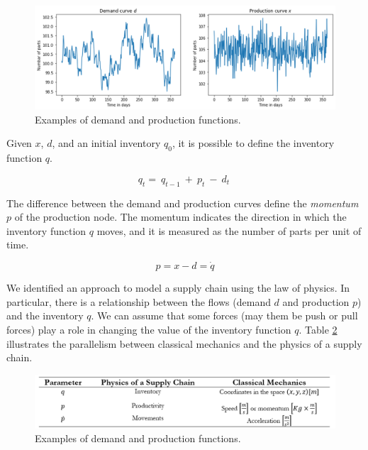 \begin{figure}[hbt!]
\centering
\includegraphics[width=1\textwidth]{SectionIntroduction/informationFramework_figures/fig_demandProduction.png}
\captionsetup{type=figure}
\caption{Examples of demand and production functions.}
\label{fig_demandProduction}
\end{figure}

Given $x$, $d$, and an initial inventory $q_0$, it is possible to define the inventory function $q$.

\begin{equation}
q_t=\ q_{t-1}\ +\ p_t\ -\ d_t\ 
\label{eq_physics1}
\end{equation}

The difference between the demand and production curves define the \textit{momentum} $p$ of the production node. The momentum indicates the direction in which the inventory function $q$ moves, and it is measured as the number of parts per unit of time.

\begin{equation}
p=x-d=\dot{q}
\label{eq_physics2}
\end{equation}

We identified an approach to model a supply chain using the law of physics. In particular, there is a relationship between the flows (demand $d$ and production $p$) and the inventory $q$. We can assume that some forces (may them be push or pull forces) play a role in changing the value of the inventory function $q$. Table \ref{tab_classicalMechanics} illustrates the parallelism between classical mechanics and the physics of a supply chain.

\begin{figure}[hbt!]
\centering
\includegraphics[width=1\textwidth]{SectionIntroduction/informationFramework_figures/tab_classicalMechanics.png}
\captionsetup{type=figure}
\caption{Examples of demand and production functions.}
\label{tab_classicalMechanics}
\end{figure}


